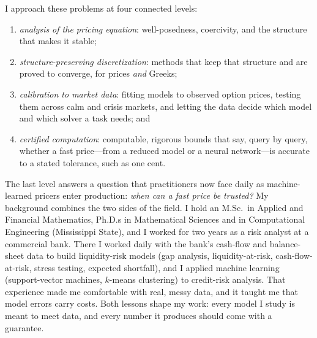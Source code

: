\documentclass[11pt]{article}
\begin{document}
I approach these problems at four connected levels:
\begin{enumerate}[label=(\roman*),leftmargin=2.2em]
\item \emph{analysis of the pricing equation}: well-posedness, coercivity,
      and the structure that makes it stable;
\item \emph{structure-preserving discretization}: methods that keep that
      structure and are proved to converge, for prices \emph{and} Greeks;
\item \emph{calibration to market data}: fitting models to observed option
      prices, testing them across calm and crisis markets, and letting the
      data decide which model and which solver a task needs; and
\item \emph{certified computation}: computable, rigorous bounds that say,
      query by query, whether a fast price---from a reduced model or a
      neural network---is accurate to a stated tolerance, such as one cent.
\end{enumerate}
The last level answers a question that practitioners now face daily as
machine-learned pricers enter production: \emph{when can a fast price be
trusted?} My background combines the two sides of the field. I hold an
M.Sc.\ in Applied and Financial Mathematics, Ph.D.s in Mathematical
Sciences and in Computational Engineering (Mississippi State), and I
worked for two years as a risk analyst at a commercial bank. There I
worked daily with the bank's cash-flow and balance-sheet data to build
liquidity-risk models (gap analysis, liquidity-at-risk, cash-flow-at-risk,
stress testing, expected shortfall), and I applied machine learning
(support-vector machines, $k$-means clustering) to credit-risk analysis.
That experience made me comfortable with real, messy data, and it taught
me that model errors carry costs. Both lessons shape my work: every model
I study is meant to meet data, and every number it produces should come
with a guarantee.
\end{document}
